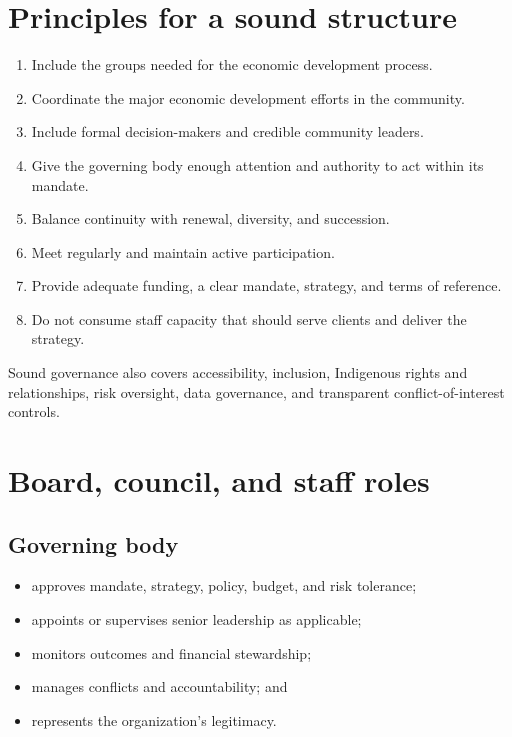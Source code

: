 \documentclass[11pt,letterpaper,oneside,openany]{book}
\begin{document}
\section[Principles for a sound structure]{Principles for a sound structure}
\begin{enumerate}
\item Include the groups needed for the economic development process.
\item Coordinate the major economic development efforts in the community.
\item Include formal decision-makers and credible community leaders.
\item Give the governing body enough attention and authority to act within its mandate.
\item Balance continuity with renewal, diversity, and succession.
\item Meet regularly and maintain active participation.
\item Provide adequate funding, a clear mandate, strategy, and terms of reference.
\item Do not consume staff capacity that should serve clients and deliver the strategy.
\end{enumerate}


Sound governance also covers accessibility, inclusion, Indigenous rights and relationships, risk oversight, data governance, and transparent conflict-of-interest controls.


\section[Board, council, and staff roles]{Board, council, and staff roles}
\subsection[Governing body]{Governing body}
\begin{itemize}
\item approves mandate, strategy, policy, budget, and risk tolerance;
\item appoints or supervises senior leadership as applicable;
\item monitors outcomes and financial stewardship;
\item manages conflicts and accountability; and
\item represents the organization's legitimacy.
\end{itemize}
\end{document}
